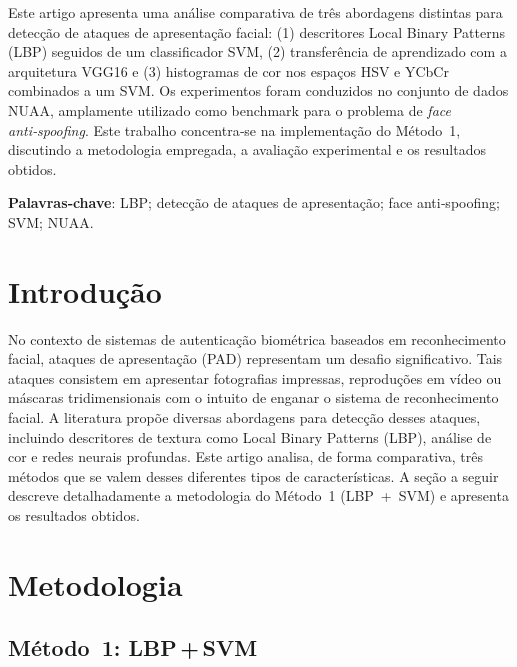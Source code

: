 \documentclass[
    article,
    11pt,
    oneside,
    a4paper,
    english,
    brazil,
    sumario=tradicional
]{abntex2}
\begin{document}
\frenchspacing

\maketitle

\begin{resumoumacoluna}
    Este artigo apresenta uma análise comparativa de três abordagens distintas para detecção de ataques de apresentação facial: (1) descritores Local Binary Patterns (LBP) seguidos de um classificador SVM, (2) transferência de aprendizado com a arquitetura VGG16 e (3) histogramas de cor nos espaços HSV e YCbCr combinados a um SVM. Os experimentos foram conduzidos no conjunto de dados NUAA, amplamente utilizado como benchmark para o problema de \emph{face anti‑spoofing}. Este trabalho concentra‑se na implementação do Método 1, discutindo a metodologia empregada, a avaliação experimental e os resultados obtidos.

    \vspace{\onelineskip}

    \noindent
    \textbf{Palavras‑chave}: LBP; detecção de ataques de apresentação; face anti‑spoofing; SVM; NUAA.
\end{resumoumacoluna}

\section*{Introdução}

No contexto de sistemas de autenticação biométrica baseados em reconhecimento facial, ataques de apresentação (PAD) representam um desafio significativo. Tais ataques consistem em apresentar fotografias impressas, reproduções em vídeo ou máscaras tridimensionais com o intuito de enganar o sistema de reconhecimento facial. A literatura propõe diversas abordagens para detecção desses ataques, incluindo descritores de textura como Local Binary Patterns (LBP), análise de cor e redes neurais profundas. Este artigo analisa, de forma comparativa, três métodos que se valem desses diferentes tipos de características. A seção a seguir descreve detalhadamente a metodologia do Método 1 (LBP + SVM) e apresenta os resultados obtidos.

\section{Metodologia}

\subsection{Método 1: LBP\,+\,SVM}
\end{document}

